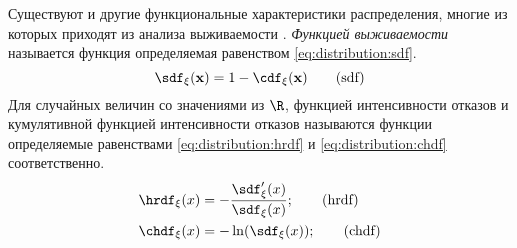 Существуют и другие функциональные характеристики распределения, многие из которых приходят из анализа выживаемости \cite{kleinbaum1996survival}. \emph{Функцией выживаемости} называется функция определяемая равенством \eqref{eq:distribution:sdf}.
\begin{equation}
    \label{eq:distribution:sdf}
    \sdf_\xi(\mathbf{x}) = 1 - \cdf_\xi(\mathbf{x}) \tag{sdf}
\end{equation}
Для случайных величин со значениями из $\R$,  функцией интенсивности отказов и кумулятивной функцией интенсивности отказов называются функции определяемые равенствами \eqref{eq:distribution:hrdf} и \eqref{eq:distribution:chdf} соответственно. 
\begin{align}
    \label{eq:distribution:hrdf}
    &\hrdf_\xi(x) = -\frac{\sdf_\xi'(x)}{\sdf_\xi(x)}; \tag{hrdf} \\
    \label{eq:distribution:chdf}
    &\chdf_\xi(x)=-\ln(\sdf_\xi(x)); \tag{chdf}
\end{align} 
 
